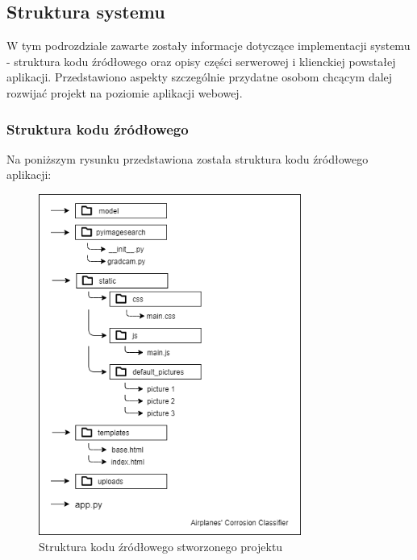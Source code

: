 \documentclass[polish,12pt]{aghthesis}
\begin{document}
\subsection{Struktura systemu}
\par W tym podrozdziale zawarte zostały informacje dotyczące implementacji systemu - struktura kodu źródłowego oraz opisy części serwerowej i klienckiej powstałej aplikacji. Przedstawiono aspekty szczególnie przydatne osobom chcącym dalej rozwijać projekt na poziomie aplikacji webowej.

\subsubsection{Struktura kodu źródłowego}
\par Na poniższym rysunku przedstawiona została struktura kodu źródłowego aplikacji:

\begin{figure}[h!]
    \centering
    \label{fig:source-code-structure}    \includegraphics[width=8.6cm]{images/struktura_systemu.png}
    \caption{Struktura kodu źródłowego stworzonego projektu}
\end{figure}
\end{document}
